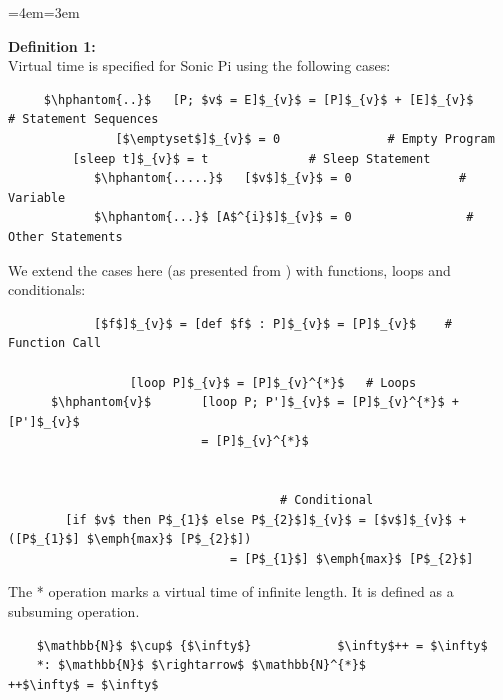 \documentclass[11pt, abstracton, twoside, titlepage=true]{scrartcl}
\newenvironment{blockquote}{
	\par
	\medskip
	\leftskip=4em\rightskip=3em
	\noindent\ignorespaces
}{
	\par\medskip
}
\begin{document}
\begin{blockquote}
	\textbf{Definition 1:} \\ 
	Virtual time is specified for Sonic Pi using the following cases:
	\\
	\begin{lstlisting}
     $\hphantom{..}$   [P; $v$ = E]$_{v}$ = [P]$_{v}$ + [E]$_{v}$       # Statement Sequences
               [$\emptyset$]$_{v}$ = 0               # Empty Program
         [sleep t]$_{v}$ = t              # Sleep Statement
            $\hphantom{.....}$   [$v$]$_{v}$ = 0               # Variable
            $\hphantom{...}$ [A$^{i}$]$_{v}$ = 0                # Other Statements
	\end{lstlisting}

	We extend the cases here (as presented from \cite{AOB14}) with functions, loops
	and conditionals:
	\\
	\begin{lstlisting}
            [$f$]$_{v}$ = [def $f$ : P]$_{v}$ = [P]$_{v}$    # Function Call

	             [loop P]$_{v}$ = [P]$_{v}^{*}$   # Loops
	  $\hphantom{v}$       [loop P; P']$_{v}$ = [P]$_{v}^{*}$ + [P']$_{v}$
	                       = [P]$_{v}^{*}$


                                      # Conditional
        [if $v$ then P$_{1}$ else P$_{2}$]$_{v}$ = [$v$]$_{v}$ + ([P$_{1}$] $\emph{max}$ [P$_{2}$])
                               = [P$_{1}$] $\emph{max}$ [P$_{2}$]
	\end{lstlisting}

	The * operation marks a virtual time of infinite length. It is defined as a 
	subsuming operation. 
	\\
	\begin{lstlisting}
	$\mathbb{N}$ $\cup$ {$\infty$}            $\infty$++ = $\infty$
	*: $\mathbb{N}$ $\rightarrow$ $\mathbb{N}^{*}$           ++$\infty$ = $\infty$
	\end{lstlisting}
\end{blockquote}
\end{document}
